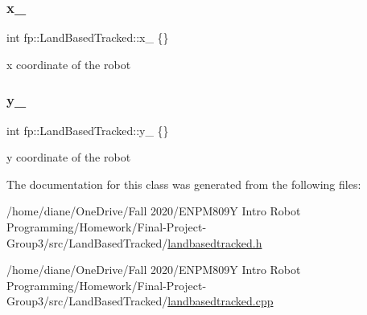 \subsubsection{\texorpdfstring{x\+\_\+}{x\_}}
{\footnotesize\ttfamily int fp\+::\+Land\+Based\+Tracked\+::x\+\_\+ \{\}\hspace{0.3cm}{\ttfamily [protected]}}

x coordinate of the robot \mbox{\label{classfp_1_1_land_based_tracked_ae8f41c1bd340a84c7704b3bd7281ae79}} 
\subsubsection{\texorpdfstring{y\+\_\+}{y\_}}
{\footnotesize\ttfamily int fp\+::\+Land\+Based\+Tracked\+::y\+\_\+ \{\}\hspace{0.3cm}{\ttfamily [protected]}}

y coordinate of the robot 

The documentation for this class was generated from the following files\+:\begin{DoxyCompactItemize}
\item 
/home/diane/\+One\+Drive/\+Fall 2020/\+E\+N\+P\+M809\+Y Intro Robot Programming/\+Homework/\+Final-\/\+Project-\/\+Group3/src/\+Land\+Based\+Tracked/\hyperlink{landbasedtracked_8h}{landbasedtracked.\+h}\item 
/home/diane/\+One\+Drive/\+Fall 2020/\+E\+N\+P\+M809\+Y Intro Robot Programming/\+Homework/\+Final-\/\+Project-\/\+Group3/src/\+Land\+Based\+Tracked/\hyperlink{landbasedtracked_8cpp}{landbasedtracked.\+cpp}\end{DoxyCompactItemize}
